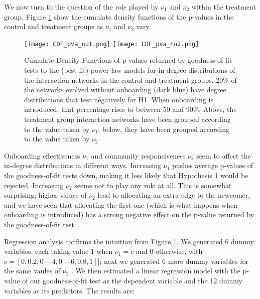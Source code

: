 We now turn to the question of the role played by $\nu_1$ and $\nu_2$ within the treatment group. Figure \ref{fig:CDFpvanu1nu2} show the cumulate density functions of the p-values in the control and treatment groups as $\nu_1$ and $\nu_2$ vary. 

\begin{figure}[thb]
\centering

	\texttt{[image: CDF\_pva\_nu1.png]}\label{fig:CDFnu1}
	\texttt{[image: CDF\_pva\_nu2.png]}\label{fig:CDFnu2}
  \caption{Cumulate Density Functions of p-values returned by goodness-of-fit tests to the (best-fit) power-law models for in-degree distributions of the interaction networks in the control and treatment groups. 20\% of the networks evolved without onboarding (dark blue) have degree distributions that test negatively for H1. When onboarding is introduced, that percentage rises to between 50 and 90\%. Above, the treatment group interaction networks have been grouped according to the value taken by $\nu_1$; below, they have been grouped according to the value taken by $\nu_2$ } 
 \label{fig:CDFpvanu1nu2}
\end{figure}

Onboarding effectiveness $\nu_1$ and community responsiveness $\nu_2$ seem to affect the in-degree distributions in different ways. Increasing $\nu_1$ pushes average p-values of the goodness-of-fit tests down, making it less likely that Hypothesis 1 would be rejected. Increasing $\nu_2$ seems not to play any role at all. This is somewhat surprising; higher values of $\nu_2$ lead to allocating an extra edge to the newcomer, and we have seen that allocating the first one (which is what happens when onboarding is introduced) has a strong negative effect on the p-value returned by the goodness-of-fit test. 

Regression analysis confirms the intuition from Figure \ref{fig:CDFpvanu1nu2}. We generated 6 dummy variables, each taking value 1 when $\nu_1 =  c$ and 0 otherwise, with $c = [0, 0.2, 0-4, 0-6, 0.8, 1]]$; next we generated 6 more dummy variables for the same vaules of $\nu_2$ . We then estimated a linear regression model with the p-value of our goodness-of-fit test as the dependent variable and the 12 dummy variables as its predictors. The results are:

